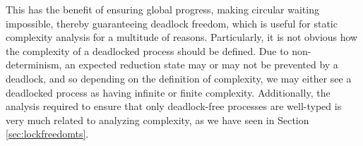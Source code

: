 This has the benefit of ensuring global progress, making circular waiting impossible, thereby guaranteeing deadlock freedom, which is useful for static complexity analysis for a multitude of reasons. Particularly, it is not obvious how the complexity of a deadlocked process should be defined. Due to non-determinism, an expected reduction state may or may not be prevented by a deadlock, and so depending on the definition of complexity, we may either see a deadlocked process as having infinite or finite complexity. Additionally, the analysis required to ensure that only deadlock-free processes are well-typed is very much related to analyzing complexity, as we have seen in Section \ref{sec:lockfreedomts}.




